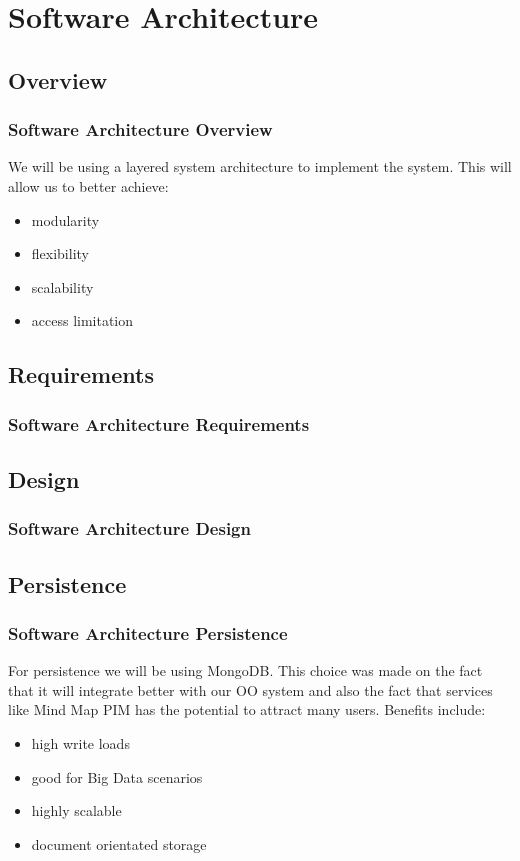 \documentclass{beamer}
\begin{document}
\section{Software Architecture}
	\subsection{Overview}
		\begin{frame}
		\frametitle{Software Architecture Overview}
			We will be using a layered system architecture to implement the system. This will allow us to better achieve:
			\begin{itemize}
				\item modularity
				\item flexibility
				\item scalability
				\item access limitation
			\end{itemize}
		\end{frame}
		
	\subsection{Requirements}
		\begin{frame}
		\frametitle{Software Architecture Requirements}
		
		\end{frame}
		
	\subsection{Design}
		\begin{frame}
		\frametitle{Software Architecture Design}
		
		\end{frame}
		
	\subsection{Persistence}
		\begin{frame}
		\frametitle{Software Architecture Persistence}
			For persistence we will be using MongoDB. This choice was made on the fact that it will integrate better with our OO system and also the fact that services like Mind Map PIM has the potential to attract many users.
			Benefits include:
			\begin{itemize}
				\item high write loads
				\item good for Big Data scenarios
				\item highly scalable
				\item document orientated storage
			\end{itemize}
		\end{frame}
		
\end{document}
